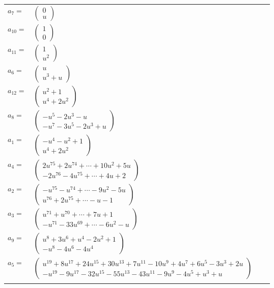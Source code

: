 \documentclass[1p]{elsarticle_modified}
\theoremstyle{definition}
\begin{document}
\begin{tabular}{m{7pt} m{180pt} m{7pt} m{180pt} }
\flushright $a_{7}=$&$\begin{pmatrix}0\\u\end{pmatrix}$ \\
\flushright $a_{10}=$&$\begin{pmatrix}1\\0\end{pmatrix}$ \\
\flushright $a_{11}=$&$\begin{pmatrix}1\\u^2\end{pmatrix}$ \\
\flushright $a_{6}=$&$\begin{pmatrix}u\\u^3+u\end{pmatrix}$ \\
\flushright $a_{12}=$&$\begin{pmatrix}u^2+1\\u^4+2 u^2\end{pmatrix}$ \\
\flushright $a_{8}=$&$\begin{pmatrix}- u^5-2 u^3- u\\- u^7-3 u^5-2 u^3+u\end{pmatrix}$ \\
\flushright $a_{1}=$&$\begin{pmatrix}- u^4- u^2+1\\u^4+2 u^2\end{pmatrix}$ \\
\flushright $a_{4}=$&$\begin{pmatrix}2 u^{75}+2 u^{74}+\cdots+10 u^2+5 u\\-2 u^{76}-4 u^{75}+\cdots+4 u+2\end{pmatrix}$ \\
\flushright $a_{2}=$&$\begin{pmatrix}- u^{75}- u^{74}+\cdots-9 u^2-5 u\\u^{76}+2 u^{75}+\cdots- u-1\end{pmatrix}$ \\
\flushright $a_{3}=$&$\begin{pmatrix}u^{71}+u^{70}+\cdots+7 u+1\\- u^{71}-33 u^{69}+\cdots-6 u^2- u\end{pmatrix}$ \\
\flushright $a_{9}=$&$\begin{pmatrix}u^8+3 u^6+u^4-2 u^2+1\\- u^8-4 u^6-4 u^4\end{pmatrix}$ \\
\flushright $a_{5}=$&$\begin{pmatrix}u^{19}+8 u^{17}+24 u^{15}+30 u^{13}+7 u^{11}-10 u^9+4 u^7+6 u^5-3 u^3+2 u\\- u^{19}-9 u^{17}-32 u^{15}-55 u^{13}-43 u^{11}-9 u^9-4 u^5+u^3+u\end{pmatrix}$\\&\end{tabular}
\end{document}
